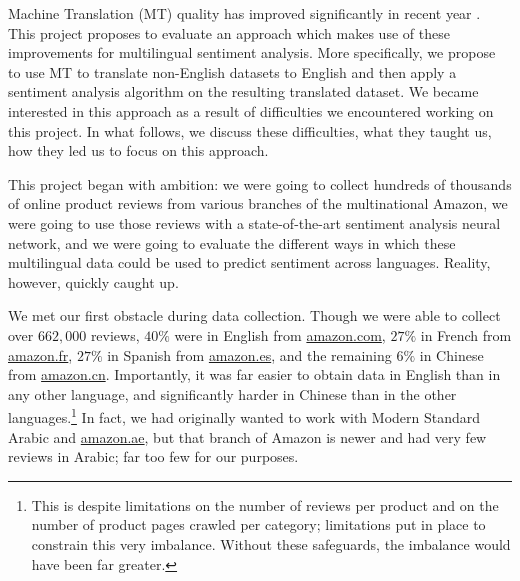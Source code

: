 \documentclass[11pt,a4paper]{article}
\newcommand{\amazon}[1]{\href{http://www.amazon.#1}{amazon.#1}}
\begin{document}
\begin{comment}
Our project is concerned with low budget sentiment analysis of data coming from four languages: English, French, Spanish, and Mandarin Chinese. Our interest in the low budget aspect of sentiment analysis was borne out of the difficulties encountered through out the realization of this project. As outlined below, we managed to circumvent many of these issues and this report outlines our experience and what we learned from working through these issues.
\end{comment}

Machine Translation (MT) quality has improved significantly in recent year \cite{hirschberg2015advances, lample2018phrase}. This project proposes to evaluate an approach which makes use of these improvements for multilingual sentiment analysis. More specifically, we propose to use MT to translate non-English datasets to English and then apply a sentiment analysis algorithm on the resulting translated dataset. We became interested in this approach as a result of difficulties we encountered working on this project. In what follows, we discuss these difficulties, what they taught us, how they led us to focus on this approach.

This project began with ambition: we were going to collect hundreds of thousands of online product reviews from various branches of the multinational Amazon, we were going to use those reviews with a state-of-the-art sentiment analysis neural network, and we were going to evaluate the different ways in which these multilingual data could be used to predict sentiment across languages. Reality, however, quickly caught up.

We met our first obstacle during data collection. Though we were able to collect over $662,000$ reviews, $40\%$ were in English from \amazon{com}, $27\%$ in French from \amazon{fr}, $27\%$ in Spanish from \amazon{es}, and the remaining $6\%$ in Chinese from \amazon{cn}. Importantly, it was far easier to obtain data in English than in any other language, and significantly harder in Chinese than in the other languages.\footnote{This is despite limitations on the number of reviews per product and on the number of product pages crawled per category; limitations put in place to constrain this very imbalance. Without these safeguards, the imbalance would have been far greater.} In fact, we had originally wanted to work with Modern Standard Arabic and \amazon{ae}, but that branch of Amazon is newer and had very few reviews in Arabic; far too few for our purposes. 
\end{document}
